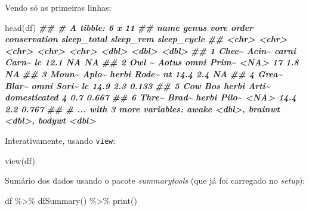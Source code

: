 \documentclass[
  12pt]{report}
\newenvironment{Shaded}{\begin{snugshade}}{\end{snugshade}}
\newcommand{\DocumentationTok}[1]{\textcolor[rgb]{0.56,0.35,0.01}{\textbf{\textit{#1}}}}
\newcommand{\FunctionTok}[1]{\textcolor[rgb]{0.00,0.00,0.00}{#1}}
\newcommand{\NormalTok}[1]{#1}
\newcommand{\SpecialCharTok}[1]{\textcolor[rgb]{0.00,0.00,0.00}{#1}}
\begin{document}
Vendo só as primeiras linhas:

\begin{Shaded}
\begin{Highlighting}[]
\FunctionTok{head}\NormalTok{(df)}
\DocumentationTok{\#\# \# A tibble: 6 x 11}
\DocumentationTok{\#\#   name  genus vore  order conservation sleep\_total sleep\_rem sleep\_cycle}
\DocumentationTok{\#\#   \textless{}chr\textgreater{} \textless{}chr\textgreater{} \textless{}chr\textgreater{} \textless{}chr\textgreater{} \textless{}chr\textgreater{}              \textless{}dbl\textgreater{}     \textless{}dbl\textgreater{}       \textless{}dbl\textgreater{}}
\DocumentationTok{\#\# 1 Chee\textasciitilde{} Acin\textasciitilde{} carni Carn\textasciitilde{} lc                  12.1      NA        NA    }
\DocumentationTok{\#\# 2 Owl \textasciitilde{} Aotus omni  Prim\textasciitilde{} \textless{}NA\textgreater{}                17         1.8      NA    }
\DocumentationTok{\#\# 3 Moun\textasciitilde{} Aplo\textasciitilde{} herbi Rode\textasciitilde{} nt                  14.4       2.4      NA    }
\DocumentationTok{\#\# 4 Grea\textasciitilde{} Blar\textasciitilde{} omni  Sori\textasciitilde{} lc                  14.9       2.3       0.133}
\DocumentationTok{\#\# 5 Cow   Bos   herbi Arti\textasciitilde{} domesticated         4         0.7       0.667}
\DocumentationTok{\#\# 6 Thre\textasciitilde{} Brad\textasciitilde{} herbi Pilo\textasciitilde{} \textless{}NA\textgreater{}                14.4       2.2       0.767}
\DocumentationTok{\#\# \# ... with 3 more variables: awake \textless{}dbl\textgreater{}, brainwt \textless{}dbl\textgreater{}, bodywt \textless{}dbl\textgreater{}}
\end{Highlighting}
\end{Shaded}

Interativamente, usando \texttt{view}:

\begin{Shaded}
\begin{Highlighting}[]
\FunctionTok{view}\NormalTok{(df)}
\end{Highlighting}
\end{Shaded}

Sumário dos dados usando o pacote \emph{summarytools} (que já foi carregado no \emph{setup}):

\begin{Shaded}
\begin{Highlighting}[]
\NormalTok{df }\SpecialCharTok{\%\textgreater{}\%} \FunctionTok{dfSummary}\NormalTok{() }\SpecialCharTok{\%\textgreater{}\%} \FunctionTok{print}\NormalTok{()}
\end{Highlighting}
\end{Shaded}
\end{document}
